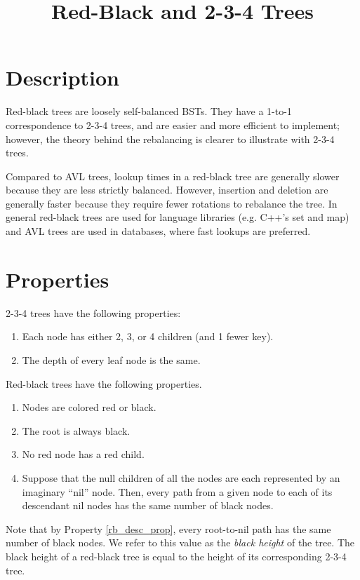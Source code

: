 \documentclass[12pt]{article}
\begin{document}
\title{Red-Black and 2-3-4 Trees}
\author{}
\maketitle

\section*{Description}
Red-black trees are loosely self-balanced BSTs. They have a 1-to-1 correspondence to 2-3-4 trees, and are easier and more efficient to implement; however, the theory behind the rebalancing is clearer to illustrate with 2-3-4 trees.

Compared to AVL trees, lookup times in a red-black tree are generally slower because they are less strictly balanced. However, insertion and deletion are generally faster because they require fewer rotations to rebalance the tree. In general red-black trees are used for language libraries (e.g. C++'s set and map) and AVL trees are used in databases, where fast lookups are preferred.

\section*{Properties}
2-3-4 trees have the following properties:
\begin{enumerate}
  \item Each node has either 2, 3, or 4 children (and 1 fewer key). \item The depth of every leaf node is the same.
\end{enumerate}

\noindent Red-black trees have the following properties.
\begin{enumerate}
  \item Nodes are colored red or black.
  \item The root is always black.
  \item No red node has a red child.
  \item \label{rb_desc_prop} Suppose that the null children of all the nodes are each represented by an imaginary ``nil'' node. Then, every path from a given node to each of its descendant nil nodes has the same number of black nodes.
\end{enumerate}
Note that by Property \ref{rb_desc_prop}, every root-to-nil path has the same number of black nodes. We refer to this value as the \emph{black height} of the tree. The black height of a red-black tree is equal to the height of its corresponding 2-3-4 tree.
\end{document}
